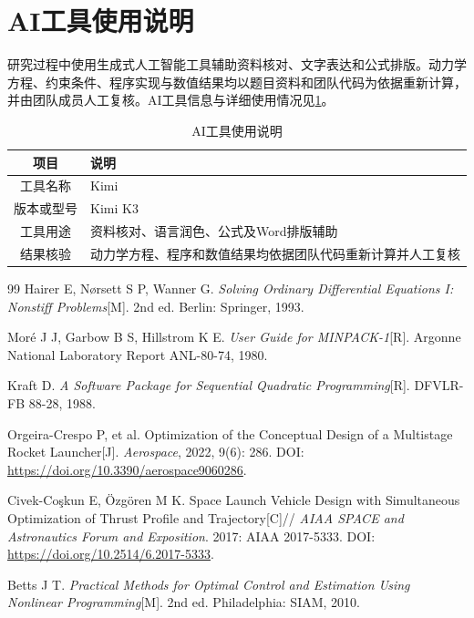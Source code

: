 \documentclass{JXUSTmodeling}
\begin{document}
\section{AI工具使用说明}\label{sec:7}
研究过程中使用生成式人工智能工具辅助资料核对、文字表达和公式排版。动力学方程、约束条件、程序实现与数值结果均以题目资料和团队代码为依据重新计算，并由团队成员人工复核。AI工具信息与详细使用情况见\ref{tab:AI_usage}。
\begin{table}[htbp]
	\centering
	\caption{AI工具使用说明}\label{tab:AI_usage}
	\begin{tabularx}{\textwidth}{cX}
		\toprule
		项目 & 说明\\
		\midrule
		工具名称 & Kimi\\
		版本或型号 & Kimi K3 \\ 
		工具用途 & 资料核对、语言润色、公式及Word排版辅助\\
		结果核验 & 动力学方程、程序和数值结果均依据团队代码重新计算并人工复核\\
		\bottomrule
	\end{tabularx}
\end{table}
\clearpage
\begin{thebibliography}{99}
	Hairer E, N{\o}rsett S P, Wanner G.
	\newblock \textit{Solving Ordinary Differential Equations I: Nonstiff Problems}[M].
	\newblock 2nd ed. Berlin: Springer, 1993.
	
	Mor\'e J J, Garbow B S, Hillstrom K E.
	\newblock \textit{User Guide for MINPACK-1}[R].
	\newblock Argonne National Laboratory Report ANL-80-74, 1980.
	
	Kraft D.
	\newblock \textit{A Software Package for Sequential Quadratic Programming}[R].
	\newblock DFVLR-FB 88-28, 1988.
	
	Orgeira-Crespo P, et al.
	\newblock Optimization of the Conceptual Design of a Multistage Rocket Launcher[J].
	\newblock \textit{Aerospace}, 2022, 9(6): 286.
	\newblock DOI: \url{https://doi.org/10.3390/aerospace9060286}.
	
	Civek-Co\c{s}kun E, \"Ozg\"oren M K.
	\newblock Space Launch Vehicle Design with Simultaneous Optimization of
	Thrust Profile and Trajectory[C]//
	\newblock \textit{AIAA SPACE and Astronautics Forum and Exposition}.
	2017: AIAA 2017-5333.
	\newblock DOI: \url{https://doi.org/10.2514/6.2017-5333}.
	
	Betts J T.
	\newblock \textit{Practical Methods for Optimal Control and Estimation
		Using Nonlinear Programming}[M].
	\newblock 2nd ed. Philadelphia: SIAM, 2010.
	
\end{thebibliography}
\end{document}
